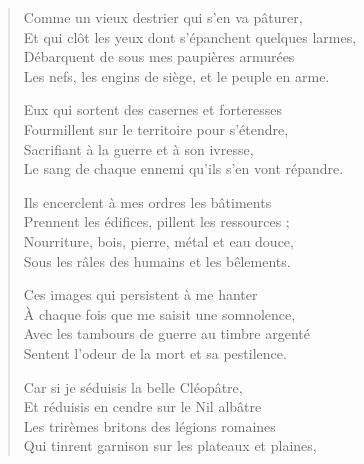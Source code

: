 \begin{verse}\quatrain
  Comme un vieux destrier qui s’en va pâturer,\\  
  Et qui clôt les yeux dont s’épanchent quelques larmes,\\  
  Débarquent de sous mes paupières armurées\\  
  Les nefs, les engins de siège, et le peuple en arme.  

  Eux qui sortent des casernes et forteresses\\  
  Fourmillent sur le territoire pour s’étendre,\\  
  Sacrifiant à la guerre et à son ivresse,\\  
  Le sang de chaque ennemi qu’ils s’en vont répandre.  

  Ils encerclent à mes ordres les bâtiments\\  
  Prennent les édifices, pillent les ressources ;\\  
  Nourriture, bois, pierre, métal et eau douce,\\  
  Sous les râles des humains et les bêlements.  

  Ces images qui persistent à me hanter\\  
  À chaque  fois que me saisit une somnolence,\\  
  Avec les tambours de guerre au timbre argenté\\  
  Sentent l’odeur de la mort et sa pestilence.  

  Car si je séduisis la belle Cléopâtre,\\  
  Et réduisis en cendre sur le Nil albâtre\\  
  Les trirèmes britons des légions romaines\\  
  Qui tinrent garnison sur les plateaux et plaines,  


\end{verse}
